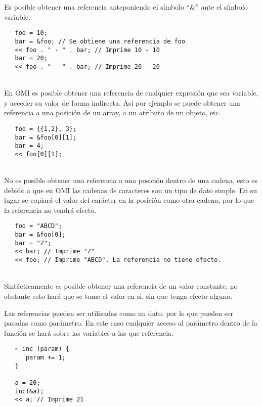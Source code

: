 Es posible obtener una referencia anteponiendo el símbolo ``$\&$'' ante el símbolo variable. \\

\begin{lstlisting}
   foo = 10;
   bar = &foo; // Se obtiene una referencia de foo
   << foo . " - " . bar; // Imprime 10 - 10
   bar = 20; 
   << foo . " - " . bar; // Imprime 20 - 20 
\end{lstlisting}
\hfill\\

En OMI es posible obtener una referencia de cualquier expresión que sea variable, y acceder su valor de forma indirecta. Así por
ejemplo se puede obtener una referencia a una posición de un array, a un atributo de un objeto, etc. \\

\begin{lstlisting}
   foo = {{1,2}, 3}; 
   bar = &foo[0][1];
   bar = 4;
   << foo[0][1];
\end{lstlisting}
\hfill\\

No es posible obtener una referencia a una posición dentro de una cadena, esto es debido a que en OMI las cadenas de caracteres son un tipo de dato simple.  
En su lugar se copiará el valor del carácter en la posición como otra cadena, por lo que la referencia no tendrá efecto. \\

\begin{lstlisting}
   foo = "ABCD"; 
   bar = &foo[0];
   bar = "Z";
   << bar; // Imprime "Z"
   << foo; // Imprime "ABCD". La referencia no tiene efecto.
\end{lstlisting}
\hfill\\

Sintácticamente es posible obtener una referencia de un valor constante, no obstante esto hará que se tome el valor en si, sin que tenga efecto alguno.

Las referencias pueden ser utilizadas como un dato, por lo que pueden ser pasadas como parámetro. En este caso cualquier acceso al parámetro dentro de la función 
se hará sobre las variables a las que referencia. \\

\begin{lstlisting}
   ~ inc (param) {
      param += 1;
   }
   
   a = 20;
   inc(&a);
   << a; // Imprime 21
\end{lstlisting}
\hfill\\

